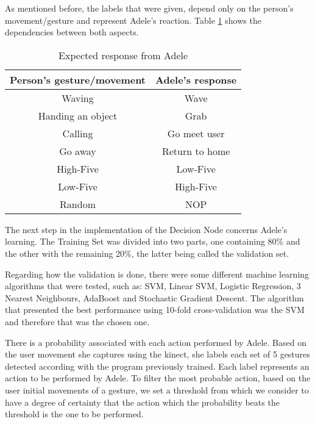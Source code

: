 As mentioned before, the labels that were given, depend only on the person's movement/gesture and represent Adele's reaction. Table \color{red}\ref{tab:expected_response} \color{black} shows the dependencies between both aspects.
\begin{table}[!h]
\centering
\label{tab:expected_response}
\begin{tabular}{|c|c|}
\hline
\textbf{Person's gesture/movement} & \textbf{Adele's response} \\ \hline
Waving                           & Wave                                 \\
Handing an object                & Grab                            		\\
Calling                          & Go meet user                         \\
Go away                          & Return to home                       \\
High-Five                        & Low-Five                             \\
Low-Five                         & High-Five                            \\
Random                           & NOP                                  \\ \hline
\end{tabular}
\caption{Expected response from Adele}
\end{table}

The next step in the implementation of the Decision Node concerns Adele's learning. The Training Set was divided into two parts, one containing 80\% and the other with the remaining 20\%, the latter being called the validation set.

Regarding how the validation is done, there were some different machine learning algorithms that were tested, such as: SVM, Linear SVM, Logistic Regression, 3 Nearest Neighbours, AdaBoost and Stochastic Gradient Descent. The algorithm that presented the best performance using 10-fold cross-validation was the SVM and therefore that was the chosen one.

There is a probability associated with each action performed by Adele. Based on the user movement she captures using the kinect, she labels each set of 5 gestures detected according with the program previously trained. Each label represents an action to be performed by Adele. To filter the most probable action, based on the user initial movements of a gesture, we set a threshold from which we consider to have a degree of certainty that the action which the probability beats the threshold is the one to be performed. 


